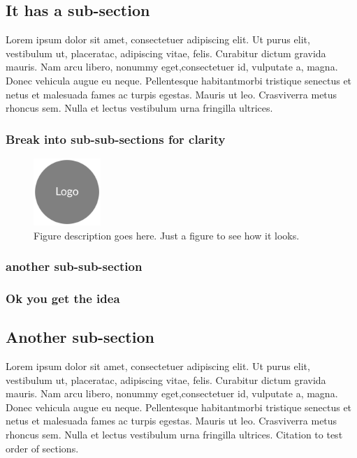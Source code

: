 \documentclass[a4paper, oneside, 11pt]{book}
\begin{document}
  \subsection{It has a sub-section}

  Lorem ipsum dolor sit amet, consectetuer adipiscing elit. Ut purus elit, vestibulum ut, placeratac, adipiscing vitae, felis. Curabitur dictum gravida mauris. Nam arcu libero, nonummy eget,consectetuer id, vulputate a, magna. Donec vehicula augue eu neque. Pellentesque habitantmorbi tristique senectus et netus et malesuada fames ac turpis egestas. Mauris ut leo. Crasviverra metus rhoncus sem. Nulla et lectus vestibulum urna fringilla ultrices.

      \subsubsection{Break into sub-sub-sections for clarity}
      \lipsum[1]
			\begin{figure}
			  \centering
				\includegraphics[width=1in, keepaspectratio]{logo.png}
				\caption[Appears in figure list]{\small Figure description goes here. Just a figure to see how it looks.}
			\end{figure}

      \subsubsection{another sub-sub-section}
      \lipsum[1-2]

      \subsubsection{Ok you get the idea}
      \lipsum[1]

    \subsection{Another sub-section}
    Lorem ipsum dolor sit amet, consectetuer adipiscing elit. Ut purus elit, vestibulum ut, placeratac, adipiscing vitae, felis. Curabitur dictum gravida mauris. Nam arcu libero, nonummy eget,consectetuer id, vulputate a, magna. Donec vehicula augue eu neque. Pellentesque habitantmorbi tristique senectus et netus et malesuada fames ac turpis egestas. Mauris ut leo. Crasviverra metus rhoncus sem. Nulla et lectus vestibulum urna fringilla ultrices.
    Citation to test order of sections.
\end{document}
